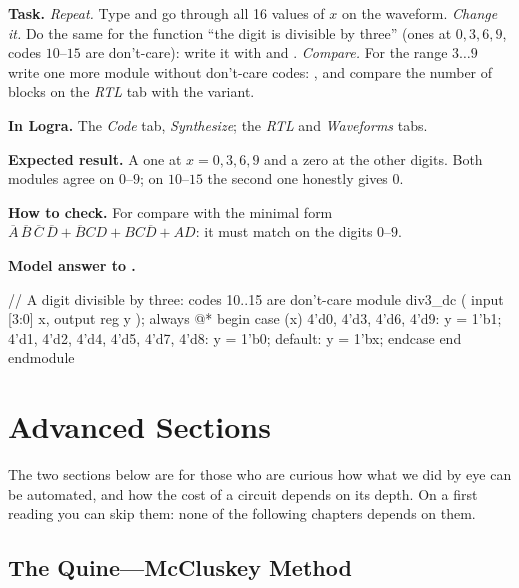 \begin{diybox}
\textbf{Task.}  \emph{Repeat.} Type  and go
through all 16 values of $x$ on the waveform.  \emph{Change it.} Do
the same for the function ``the digit is divisible by three'' (ones at
$0,3,6,9$, codes $10$--$15$ are don't-care): write it with  and
.  \emph{Compare.} For the range $3\ldots9$
write one more module without don't-care codes: ,
and compare the number of blocks on the \emph{RTL} tab with the  variant.

\textbf{In Logra.} The \emph{Code} tab, \emph{Synthesize}; the \emph{RTL} and
\emph{Waveforms} tabs.

\textbf{Expected result.}  A one at $x=0,3,6,9$ and a zero at the
other digits.  Both modules agree on $0$--$9$; on
$10$--$15$ the second one honestly gives $0$.

\textbf{How to check.} For  compare with the minimal form
$\overline{A}\,\overline{B}\,\overline{C}\,\overline{D}+\overline{B}CD+BC\overline{D}+AD$:
it must match on the digits $0$--$9$.
\end{diybox}

\textbf{Model answer to .}

\begin{vcode}
// A digit divisible by three: codes 10..15 are don't-care
module div3_dc (
    input      [3:0] x,
    output reg       y
);
    always @* begin
        case (x)
            4'd0, 4'd3, 4'd6, 4'd9:                 y = 1'b1;
            4'd1, 4'd2, 4'd4, 4'd5, 4'd7, 4'd8:     y = 1'b0;
            default:                                y = 1'bx;
        endcase
    end
endmodule
\end{vcode}

\section{Advanced Sections}

The two sections below are for those who are curious how what we did by eye
can be automated, and how the cost of a circuit depends on its depth. On a
first reading you can skip them: none of the following chapters depends on
them.

\subsection{The Quine---McCluskey Method}

